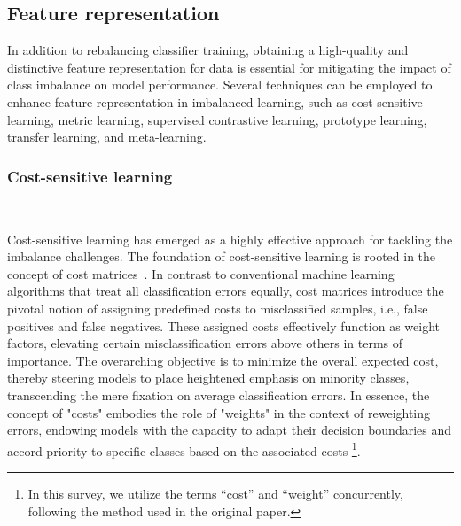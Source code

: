 \subsection{Feature representation}
\label{s32}
In addition to rebalancing classifier training, obtaining a high-quality and distinctive feature representation for data is essential for mitigating the impact of class imbalance on model performance. Several techniques can be employed to enhance feature representation in imbalanced learning, such as cost-sensitive learning, metric learning, supervised contrastive learning, prototype learning, transfer learning, and meta-learning.

\subsubsection{Cost-sensitive learning}\
\label{s321}

Cost-sensitive learning has emerged as a highly effective approach for tackling the imbalance challenges. 
The foundation of cost-sensitive learning is rooted in the concept of cost matrices~\cite{ref_A}. In contrast to conventional machine learning algorithms that treat all classification errors equally, cost matrices introduce the pivotal notion of assigning predefined costs to misclassified samples, i.e., false positives and false negatives. These assigned costs effectively function as weight factors, elevating certain misclassification errors above others in terms of importance. The overarching objective is to minimize the overall expected cost, thereby steering models to place heightened emphasis on minority classes, transcending the mere fixation on average classification errors. In essence, the concept of "costs" embodies the role of "weights" in the context of reweighting errors, endowing models with the capacity to adapt their decision boundaries and accord priority to specific classes based on the associated costs {\footnote{In this survey, we utilize the terms ``cost'' and ``weight'' concurrently, following the method used in the original paper.}}.


